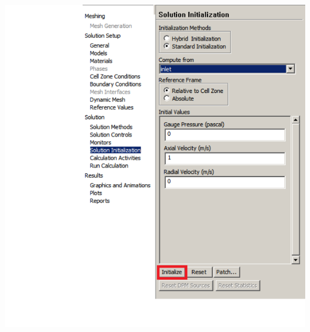 \documentclass[10pt,compress, unknownkeysallowed]{beamer}
\begin{document}
\begin{frame}
\begin{columns}
\begin{column}[l]{0.5\linewidth}
{\begin{center}
                   \includegraphics[width=\columnwidth, clip]{./Figs/ProblemSetup7.pdf}
               \end{center}}
           \end{column}
    \end{columns}
\end{frame}


\end{document}
